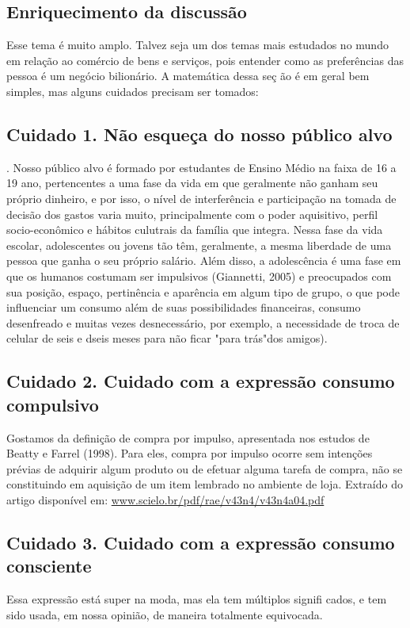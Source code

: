 \begin{paginatexto}
\section*{Enriquecimento da discussão}

Esse tema é muito amplo. Talvez seja um dos temas mais estudados no mundo em relação ao comércio de bens e serviços, pois entender como as preferências das pessoa é um negócio bilionário. A matemática dessa seç ão é em geral bem simples, mas alguns cuidados precisam ser tomados:


\subsection{Cuidado 1. Não esqueça do nosso público alvo}. Nosso público alvo é formado por estudantes de Ensino Médio na faixa de 16 a 19 ano, pertencentes a uma fase da vida em que geralmente não ganham seu próprio dinheiro, e por isso, o nível de interferência e participação na tomada de decisão dos gastos varia muito, principalmente com o poder aquisitivo, perfil socio-econômico e hábitos culutrais da família que integra. Nessa fase da vida escolar, adolescentes ou jovens tão têm, geralmente, a mesma liberdade de uma pessoa que ganha o seu próprio salário. Além disso, a adolescência é uma fase em que os humanos costumam ser impulsivos (Giannetti, 2005) e preocupados com sua posição, espaço, pertinência e aparência em algum tipo de grupo, o que pode influenciar um consumo além de suas possibilidades financeiras, consumo desenfreado e muitas vezes desnecessário, por exemplo, a necessidade de troca de celular de seis e dseis meses para não ficar "para trás"{}dos amigos).

\subsection{Cuidado 2. Cuidado com a expressão consumo compulsivo}

Gostamos da definição de compra por impulso, apresentada nos estudos de Beatty e Farrel (1998). Para eles, compra por impulso ocorre sem intenções prévias de adquirir algum produto ou de efetuar alguma tarefa de compra, não se constituindo em aquisição de um item lembrado no ambiente de loja. Extraído do artigo disponível em: \url{www.scielo.br/pdf/rae/v43n4/v43n4a04.pdf}


\subsection{Cuidado 3. Cuidado com a expressão consumo consciente} Essa expressão está super na moda, mas ela tem múltiplos signifi cados, e tem sido usada, em nossa opinião, de maneira totalmente equivocada.


\end{paginatexto}
